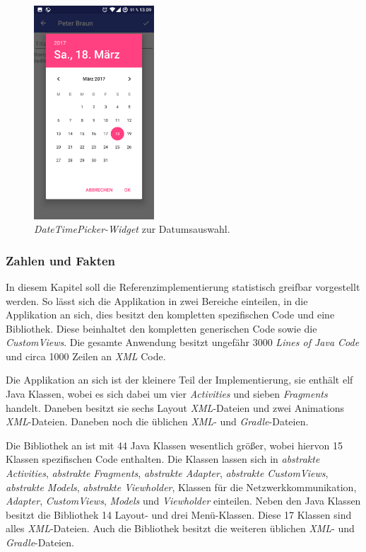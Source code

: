 \begin{figure}[H]
	\begin{center}
		\includegraphics[width=0.4\textwidth]{images/date.png}
		\caption{\textit{DateTimePicker-Widget} zur Datumsauswahl.}
		\label{fig:date}
	\end{center}
\end{figure}

\subsubsection{Zahlen und Fakten}
In diesem Kapitel soll die Referenzimplementierung statistisch greifbar vorgestellt werden. So lässt sich die Applikation in zwei Bereiche einteilen, in die Applikation an sich, dies besitzt den kompletten spezifischen Code und eine Bibliothek. Diese beinhaltet den kompletten generischen Code sowie die \textit{CustomViews}. Die gesamte Anwendung besitzt ungefähr 3000 \textit{Lines of Java Code} und circa 1000 Zeilen an \textit{XML} Code. 

Die Applikation an sich ist der kleinere Teil der Implementierung, sie enthält elf Java Klassen, wobei es sich dabei um vier \textit{Activities} und sieben \textit{Fragments} handelt. Daneben besitzt sie sechs Layout \textit{XML}-Dateien und zwei Animations \textit{XML}-Dateien. Daneben noch die üblichen \textit{XML}- und \textit{Gradle}-Dateien.

Die Bibliothek an ist mit 44 Java Klassen wesentlich größer, wobei hiervon 15 Klassen spezifischen Code enthalten. Die Klassen lassen sich in \textit{abstrakte Activities}, \textit{abstrakte Fragments}, \textit{abstrakte Adapter}, \textit{abstrakte CustomViews}, \textit{abstrakte Models}, \textit{abstrakte Viewholder},  Klassen für die Netzwerkkommunikation, \textit{Adapter}, \textit{CustomViews}, \textit{Models} und \textit{Viewholder} einteilen. Neben den Java Klassen besitzt die Bibliothek 14 Layout- und drei Menü-Klassen. Diese 17 Klassen sind alles \textit{XML}-Dateien. Auch die Bibliothek besitzt die weiteren üblichen \textit{XML}- und \textit{Gradle}-Dateien.

